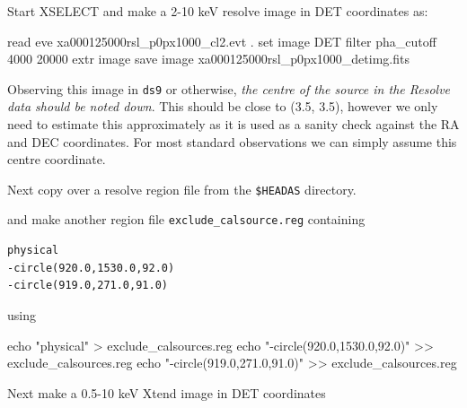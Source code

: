 \documentclass[
  letterpaper,
  DIV=11,
  numbers=noendperiod]{scrreprt}
\newenvironment{Shaded}{\begin{snugshade}}{\end{snugshade}}
\newcommand{\BuiltInTok}[1]{\textcolor[rgb]{0.00,0.23,0.31}{#1}}
\newcommand{\ExtensionTok}[1]{\textcolor[rgb]{0.00,0.23,0.31}{#1}}
\newcommand{\FunctionTok}[1]{\textcolor[rgb]{0.28,0.35,0.67}{#1}}
\newcommand{\NormalTok}[1]{\textcolor[rgb]{0.00,0.23,0.31}{#1}}
\newcommand{\OperatorTok}[1]{\textcolor[rgb]{0.37,0.37,0.37}{#1}}
\newcommand{\StringTok}[1]{\textcolor[rgb]{0.13,0.47,0.30}{#1}}
\newcommand{\VariableTok}[1]{\textcolor[rgb]{0.07,0.07,0.07}{#1}}
\begin{document}
Start XSELECT and make a 2-10 keV resolve image in DET coordinates as:

\begin{Shaded}
\begin{Highlighting}[]
\BuiltInTok{read} \VariableTok{eve} \VariableTok{xa000125000rsl\_p0px1000\_cl2}\NormalTok{.evt .}
\BuiltInTok{set}\NormalTok{ image DET}
\ExtensionTok{filter}\NormalTok{ pha\_cutoff 4000 20000}
\ExtensionTok{extr}\NormalTok{ image}
\ExtensionTok{save}\NormalTok{ image xa000125000rsl\_p0px1000\_detimg.fits}
\end{Highlighting}
\end{Shaded}

Observing this image in \texttt{ds9} or otherwise, \emph{the centre of
the source in the Resolve data should be noted down}. This should be
close to (3.5, 3.5), however we only need to estimate this approximately
as it is used as a sanity check against the RA and DEC coordinates. For
most standard observations we can simply assume this centre coordinate.

Next copy over a resolve region file from the \texttt{\$HEADAS}
directory.

\begin{Shaded}
\end{Shaded}

and make another region file \texttt{exclude\_calsource.reg} containing

\begin{verbatim}
physical
-circle(920.0,1530.0,92.0)
-circle(919.0,271.0,91.0)
\end{verbatim}

using

\begin{Shaded}
\begin{Highlighting}[]
\BuiltInTok{echo} \StringTok{"physical"} \OperatorTok{\textgreater{}}\NormalTok{ exclude\_calsources.reg}
\BuiltInTok{echo} \StringTok{"{-}circle(920.0,1530.0,92.0)"} \OperatorTok{\textgreater{}\textgreater{}}\NormalTok{ exclude\_calsources.reg}
\BuiltInTok{echo} \StringTok{"{-}circle(919.0,271.0,91.0)"} \OperatorTok{\textgreater{}\textgreater{}}\NormalTok{ exclude\_calsources.reg}
\end{Highlighting}
\end{Shaded}

Next make a 0.5-10 keV Xtend image in DET coordinates
\end{document}
